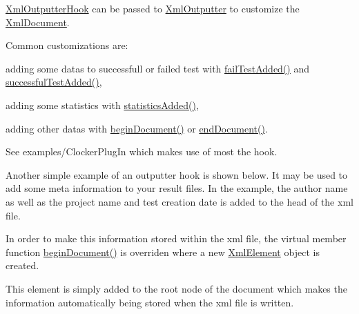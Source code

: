 \hyperlink{class_xml_outputter_hook}{Xml\-Outputter\-Hook} can be passed to \hyperlink{class_xml_outputter}{Xml\-Outputter} to customize the \hyperlink{class_xml_document}{Xml\-Document}.

Common customizations are\-:
\begin{DoxyItemize}
\item adding some datas to successfull or failed test with \hyperlink{class_xml_outputter_hook_a77310985e055cc2c67e91a42c524fbbe}{fail\-Test\-Added()} and \hyperlink{class_xml_outputter_hook_adbcf6ad2cb85d6f1015306fadb7eadcf}{successful\-Test\-Added()},
\item adding some statistics with \hyperlink{class_xml_outputter_hook_a0e602260274d4f005affb4ee84ce4c4a}{statistics\-Added()},
\item adding other datas with \hyperlink{class_xml_outputter_hook_a1d2b5d5d0fc42d273d6430522a70ccbb}{begin\-Document()} or \hyperlink{class_xml_outputter_hook_a300e2a4ef46db4e76428e32f7c7e6a23}{end\-Document()}.
\end{DoxyItemize}

See examples/\-Clocker\-Plug\-In which makes use of most the hook.

Another simple example of an outputter hook is shown below. It may be used to add some meta information to your result files. In the example, the author name as well as the project name and test creation date is added to the head of the xml file.

In order to make this information stored within the xml file, the virtual member function \hyperlink{class_xml_outputter_hook_a1d2b5d5d0fc42d273d6430522a70ccbb}{begin\-Document()} is overriden where a new \hyperlink{class_xml_element}{Xml\-Element} object is created.

This element is simply added to the root node of the document which makes the information automatically being stored when the xml file is written.


